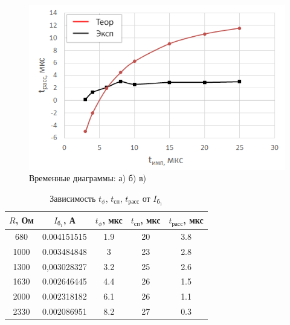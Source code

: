\begin{figure}[H]
	\begin{center}
		\includegraphics[width=13cm]{img/trass_timp}
		\caption{Временные диаграммы: а) б) в)}
		\label{p:2} %
	\end{center}
\end{figure}

\begin{table}[H]
	\begin{center}
	\caption{Зависимость $t_\phi$, $t_\text{сп}$, $t_\text{расс}$ от $I_{\text{б}_1}$}
		\begin{tabular}{|c|c|c|c|c|}
		\hline 
		$R$, Ом & $I_{\text{б}_1}$, А & $t_\phi$, мкс & $t_\text{сп}$, мкс & $t_\text{расс}$, мкс \\ 
		\hline 
		680	& 0.004151515 &	1.9 & 20 & 3.8 \\
		\hline
		1000 & 0.003484848 & 3 & 23 & 2.8 \\
		\hline
		1300 &	0,003028327 & 3.2 &	25 & 2.6 \\ 
		\hline
		1630 & 0.002646445 & 4.4 & 26 &	1.5 \\
		\hline
		2000 &	0.002318182 & 6.1 &	26 & 1.1 \\
		\hline
		2330 & 0.002086951 & 8.2 & 27 & 0.3 \\
		\hline
		\end{tabular} 
		\label{tabular:3}
	\end{center}
\end{table}


